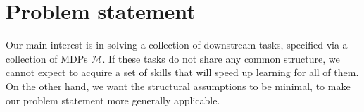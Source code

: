 \documentclass{article} %
\newcommand{\mdpset}{\mathcal{M}}
\begin{document}

    


\section{Problem statement}

Our main interest is in solving a collection of downstream tasks, specified via a collection of MDPs $\mdpset$. If these tasks do not share any common structure, we cannot expect to acquire a set of skills that will speed up learning for all of them. On the other hand, we want the structural assumptions to be minimal, to make our problem statement more generally applicable.
\end{document}
